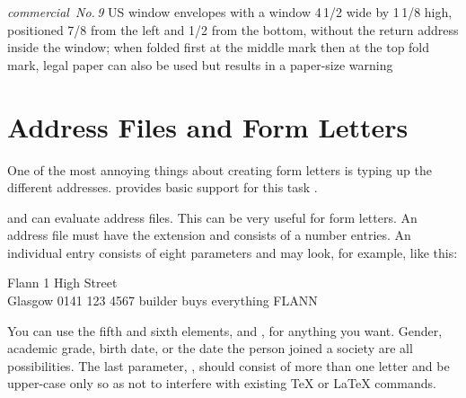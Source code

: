 \begin{desclist}
{    \emph{commercial~No.\,9} US window envelopes with a window 4\,1/2
    wide by 1\,1/8 high, positioned 7/8 from the left and
    1/2 from the bottom, without the return address inside the
    window; when folded first at the middle mark then at the top fold mark,
    legal paper can also be used but results in a paper-size warning}%
\end{desclist}
%
\EndIndexGroup
%
\EndIndexGroup


\section{Address Files and Form Letters}
%
\BeginIndexGroup
{}%
%
%
%

One of the most annoying things about creating form letters is typing up
the different addresses. \KOMAScript{} provides basic support for this task%
%
.%

\begin{Declaration}
\end{Declaration}%
 and  can evaluate address files.
This can be very useful for form letters. An address file must have the
extension  and consists of a number  entries.
An individual entry consists of eight parameters and may look, for example,
like this:
\begin{lstcode}
           {Flann}
           {1 High Street\\ Glasgow}
           {0141 123 4567}
           {builder}
           {}
           {buys everything}
           {FLANN}
\end{lstcode}
You can use the fifth and sixth elements,  and , for
anything you want. Gender, academic grade, birth date, or the date the person
joined a society are all possibilities. The last parameter, ,
should consist of more than one letter and be upper-case only so as not to
interfere with existing \TeX{} or \LaTeX{} commands.

